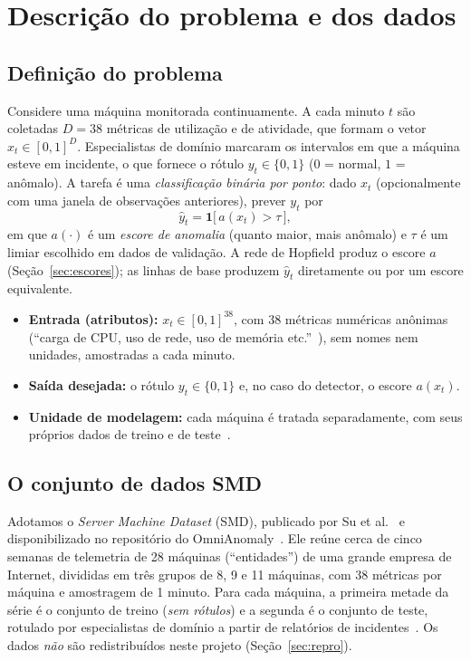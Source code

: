 \section{Descrição do problema e dos dados}\label{sec:dados}

\subsection{Definição do problema}\label{sec:problema}
Considere uma máquina monitorada continuamente. A cada minuto $t$ são coletadas $D=38$ métricas de utilização
e de atividade, que formam o vetor $x_t\in[0,1]^{D}$. Especialistas de domínio marcaram os intervalos em que a
máquina esteve em incidente, o que fornece o rótulo $y_t\in\{0,1\}$ ($0$ = normal, $1$ = anômalo). A tarefa é
uma \emph{classificação binária por ponto}: dado $x_t$ (opcionalmente com uma janela de observações anteriores),
prever $y_t$ por
\begin{equation}\label{eq:decisao}
\hat y_t=\mathbf 1\bigl[\,a(x_t)>\tau\,\bigr],
\end{equation}
em que $a(\cdot)$ é um \emph{escore de anomalia} (quanto maior, mais anômalo) e $\tau$ é um limiar escolhido em
dados de validação. A rede de Hopfield produz o escore $a$ (Seção~\ref{sec:escores}); as linhas de base
produzem $\hat y_t$ diretamente ou por um escore equivalente.

\begin{itemize}
  \item \textbf{Entrada (atributos):} $x_t\in[0,1]^{38}$, com 38 métricas numéricas anônimas (``carga de CPU,
        uso de rede, uso de memória etc.''~\cite{su2019}), sem nomes nem unidades, amostradas a cada minuto.
  \item \textbf{Saída desejada:} o rótulo $y_t\in\{0,1\}$ e, no caso do detector, o escore $a(x_t)$.
  \item \textbf{Unidade de modelagem:} cada máquina é tratada separadamente, com seus próprios dados de
        treino e de teste~\cite{su2019}.
\end{itemize}

\subsection{O conjunto de dados SMD}\label{sec:smd}
Adotamos o \emph{Server Machine Dataset} (SMD), publicado por Su et al.~\cite{su2019} e disponibilizado no
repositório do OmniAnomaly~\cite{omnianomaly}. Ele reúne cerca de cinco semanas de telemetria de 28 máquinas
(``entidades'') de uma grande empresa de Internet, divididas em três grupos de 8, 9 e 11 máquinas, com 38
métricas por máquina e amostragem de 1 minuto. Para cada máquina, a primeira metade da série é o conjunto de
treino (\emph{sem rótulos}) e a segunda é o conjunto de teste, rotulado por especialistas de domínio a partir de
relatórios de incidentes~\cite{su2019}. Os dados \emph{não} são redistribuídos neste projeto
(Seção~\ref{sec:repro}).

